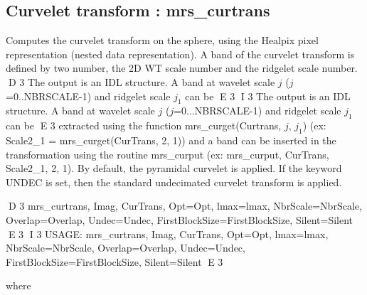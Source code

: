 \subsection{Curvelet transform : mrs\_curtrans}
Computes the curvelet transform on the sphere, using the Healpix pixel representation (nested data representation). 
A band of the curvelet transform is defined by two number, the 2D WT scale number and the ridgelet scale number. 
D 3
The output is an IDL structure. A band at wavelet scale $j$ ($j$=0..NBRSCALE-1) and ridgelet scale $j_1$ can be 
E 3
I 3
The output is an IDL structure. A band at wavelet scale $j$ ($j$=0...NBRSCALE-1) and ridgelet scale $j_1$ can be 
E 3
extracted using the function mrs\_curget(Curtrans, $j$, $j_1$) (ex: Scale2\_1 = mrs\_curget(CurTrans, 2, 1)) and 
a band can be inserted in the transformation using the routine mrs\_curput (ex: mrs\_curput, CurTrans, Scale2\_1, 2, 1). 
By default, the pyramidal curvelet is applied. If the keyword UNDEC is set, then the standard undecimated curvelet transform is applied.
{\bf
\begin{center}
D 3
       mrs\_curtrans, Imag, CurTrans, Opt=Opt, lmax=lmax, NbrScale=NbrScale, Overlap=Overlap, Undec=Undec, FirstBlockSize=FirstBlockSize, Silent=Silent
E 3
I 3
      USAGE: mrs\_curtrans, Imag, CurTrans, Opt=Opt, lmax=lmax, NbrScale=NbrScale, Overlap=Overlap, Undec=Undec, FirstBlockSize=FirstBlockSize, Silent=Silent
E 3
\end{center}}
where

